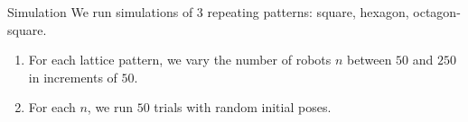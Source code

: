 \begin{frame}{Simulation}
We run simulations of $3$ repeating patterns: square, hexagon, octagon-square.
   \begin{enumerate}
   \item For each lattice pattern, we vary the number of robots $n$ between $50$ and $250$ in increments of $50$. 
   \item For each $n$, we run $50$ trials with random initial poses.
   \end{enumerate} 
  

\end{frame}